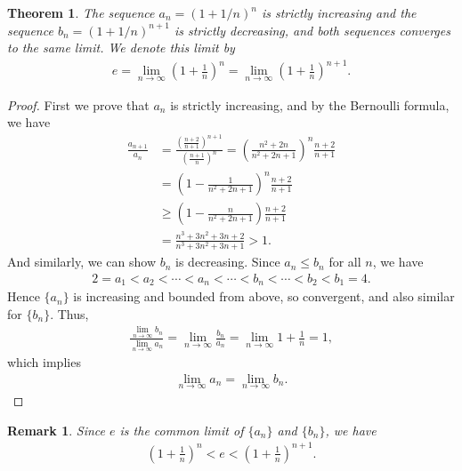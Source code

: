 \documentclass[10pt]{book}
\newtheorem{theorem}{Theorem}[chapter]
\newtheorem{remark}{Remark}[chapter]
\theoremstyle{definition}
\numberwithin{equation}{chapter}
\begin{document}
\begin{theorem}
The sequence $a_n = \left(1 + 1/n\right)^n$ is strictly increasing and the sequence $b_n = \left(1 + 1/n\right)^{n+1}$ is strictly decreasing, and both sequences converges to the same limit. We denote this limit by
\begin{align*}
    e = \lim_{n\to\infty} \left(1 + \frac{1}{n}\right)^n = \lim_{n\to\infty} \left(1 + \frac{1}{n}\right)^{n+1}.
\end{align*}
\end{theorem}
\begin{proof}
First we prove that $a_n$ is strictly increasing, and by the Bernoulli formula, we have
\begin{align*}
    \frac{a_{n+1}}{a_n} & = \frac{\left(\frac{n + 2}{n + 1}\right)^{n + 1}}{\left(\frac{n + 1}{n}\right)^{n}}  = \left(\frac{n^2 + 2n}{n^2 + 2n + 1}\right)^n \frac{n + 2}{n + 1} \\
    & = \left(1 - \frac{1}{n^2 + 2n + 1}\right)^n \frac{n + 2}{n + 1} \\
    & \geq \left(1 - \frac{n}{n^2 + 2n + 1}\right) \frac{n + 2}{n + 1} \\
    & = \frac{n^3 + 3n^2 + 3n + 2}{n^3 + 3n^2 + 3n + 1} > 1.
\end{align*}
And similarly, we can show $b_n$ is decreasing. Since $a_n \leq b_n$ for all $n$, we have
\begin{align*}
    2 = a_1 < a_2 < \cdots < a_n < \cdots < b_n < \cdots < b_2 < b_1 = 4.
\end{align*}
Hence $\{a_n\}$ is increasing and bounded from above, so convergent, and also similar for $\{b_n\}$. Thus, 
\begin{align*}
    \frac{\lim_{n\to\infty} b_n}{\lim_{n\to\infty} a_n} = \lim_{n\to\infty} \frac{b_n}{a_n} = \lim_{n\to\infty} 1 + \frac{1}{n} = 1,
\end{align*}
which implies
\begin{align*}
    \lim_{n\to\infty} a_n = \lim_{n\to\infty} b_n.
\end{align*}
\end{proof}

\begin{remark}
Since $e$ is the common limit of $\{a_n\}$ and $\{b_n\}$, we have
\begin{align}\label{remark_27_equ1}
    \left(1 + \frac{1}{n}\right)^n < e < \left(1 + \frac{1}{n}\right)^{n+1}.
\end{align}
\end{remark}
\end{document}
